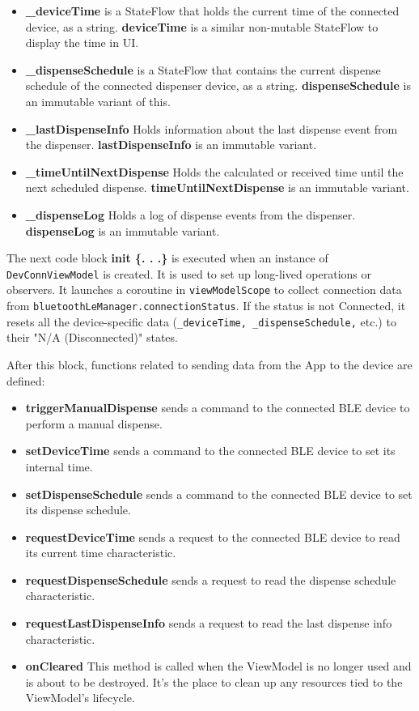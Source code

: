 \begin{itemize}
	\item \textbf{\_deviceTime} is a StateFlow that holds the current time of the connected device, as a string. \textbf{deviceTime} is a similar non-mutable StateFlow to display the time in \ac{UI}.
	\item \textbf{\_dispenseSchedule} is a StateFlow that contains the current dispense schedule of the connected dispenser device, as a string. \textbf{dispenseSchedule} is an immutable variant of this.
	\item \textbf{\_lastDispenseInfo} Holds information about the last dispense event from the dispenser. \textbf{lastDispenseInfo} is an immutable variant.
	\item \textbf{\_timeUntilNextDispense} Holds the calculated or received time until the next scheduled dispense. \textbf{timeUntilNextDispense} is an immutable variant.
	\item \textbf{\_dispenseLog} Holds a log of dispense events from the dispenser. \textbf{dispenseLog} is an immutable variant.
\end{itemize}

The next code block \textbf{init \{. . .\}} is executed when an instance of \texttt{DevConnViewModel} is created. It is used to set up long-lived operations or observers. It launches a coroutine in \texttt{viewModelScope} to collect connection data from \texttt{bluetoothLeManager.connectionStatus}. If the status is not Connected, it resets all the device-specific data (\texttt{\_deviceTime, \_dispenseSchedule,} etc.) to their "N/A (Disconnected)" states.

After this block, functions related to sending data from the App to the device are defined:
\begin{itemize}
	\item \textbf{triggerManualDispense} sends a command to the connected BLE device to perform a manual dispense.
	\item \textbf{setDeviceTime} sends a command to the connected BLE device to set its internal time.
	\item \textbf{setDispenseSchedule} sends a command to the connected BLE device to set its dispense schedule.
	\item \textbf{requestDeviceTime} sends a request to the connected BLE device to read its current time characteristic.
	\item \textbf{requestDispenseSchedule} sends a request to read the dispense schedule characteristic.
	\item \textbf{requestLastDispenseInfo} sends a request to read the last dispense info characteristic.
	\item \textbf{onCleared} This method is called when the ViewModel is no longer used and is about to be destroyed. It's the place to clean up any resources tied to the ViewModel's lifecycle.
\end{itemize}

